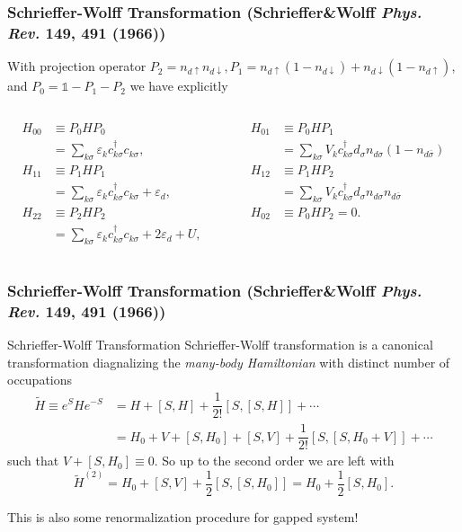 \documentclass[10pt,aspectratio=43,xcolor=x11names]{beamer}%
\begin{document}
		\begin{frame}\frametitle{Schrieffer-Wolff Transformation {\scriptsize(Schrieffer\&Wolff \textit{Phys. Rev.} \textbf{149}, 491 (1966))}}
			
			With projection operator $P_2=n_{d\uparrow}n_{d\downarrow}, P_1=n_{d\uparrow}(1-n_{d\downarrow})+n_{d\downarrow}(1-n_{d\uparrow})$, and $P_0=\mathds{1}-P_1-P_2$ we have explicitly
			\begin{columns}
				\begin{column}{0.5\textwidth}
					\begin{align*}
						H_{00}&\equiv P_0HP_0\\
						&=\sum_{k \sigma}\varepsilon_{k}c_{k\sigma}^\dagger c_{k\sigma},\\
						H_{11}&\equiv P_1HP_1\\
						&=\sum_{k \sigma}\varepsilon_{k}c_{k\sigma}^\dagger c_{k\sigma}+\varepsilon_d,\\
						H_{22}&\equiv P_2HP_2\\
						&=\sum_{k \sigma}\varepsilon_{k}c_{k\sigma}^\dagger c_{k\sigma}+2 \varepsilon_d+U,
					\end{align*}
				\end{column}
				\begin{column}{0.5\textwidth}
					\begin{align*}
						H_{01}&\equiv P_0HP_1\\
						&=\sum_{k\sigma}V_kc_{k\sigma}^\dagger d_\sigma n_{d\sigma}(1-n_{d\bar{\sigma}})\\
						H_{12}&\equiv P_1HP_2\\
						&=\sum_{k\sigma}V_kc_{k\sigma}^\dagger d_\sigma n_{d\sigma}n_{d\bar{\sigma}}\\
						H_{02}&\equiv P_0HP_2=0.
					\end{align*}
				\end{column}
			\end{columns}
		\end{frame}
		\begin{frame}\frametitle{Schrieffer-Wolff Transformation {\scriptsize(Schrieffer\&Wolff \textit{Phys. Rev.} \textbf{149}, 491 (1966))}}
			\begin{block}{Schrieffer-Wolff Transformation}
				Schrieffer-Wolff transformation is a canonical transformation diagnalizing the \emph{many-body Hamiltonian} with distinct number of occupations
				\begin{align*}
					\widetilde{H}\equiv e^{S}He^{-S}&=H+[S,H]+\dfrac{1}{2!}[S,[S,H]]+\cdots\nonumber\\
					&=H_0+V+[S,H_0]+[S,V]+\dfrac{1}{2!}[S,[S,H_0+V]]+\cdots
				\end{align*}
				such that $V+[S,H_0]\equiv0.$ So up to the second order we are left with
				\begin{equation*}
					\widetilde{H}^{(2)}=H_0+[S,V]+\dfrac{1}{2}[S,[S,H_0]]=H_0+\dfrac{1}{2}[S,H_0].
				\end{equation*}
			\end{block}
			\pause
			{\color{red}This is also some renormalization procedure for gapped system!}
		\end{frame}
\end{document}

